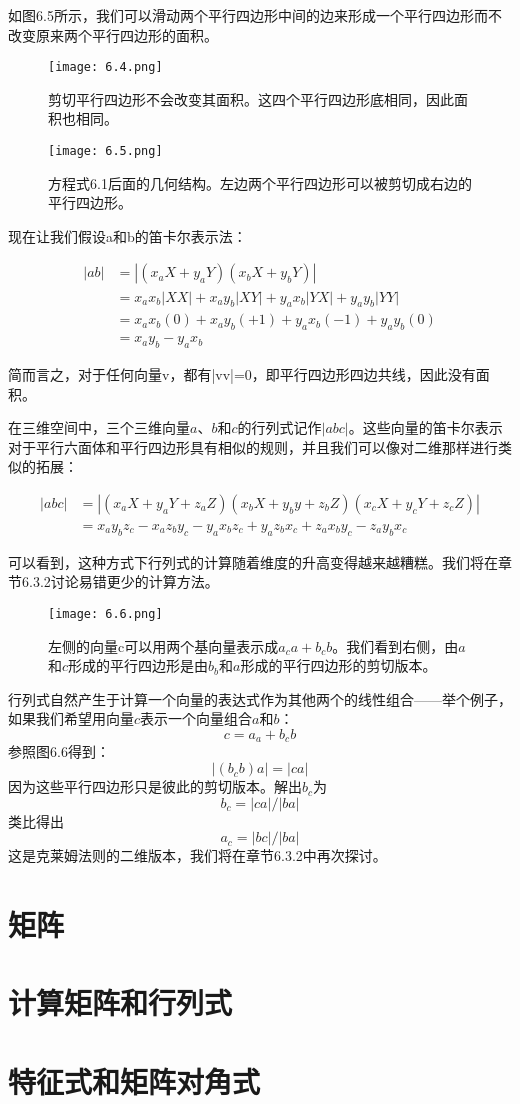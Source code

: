 \documentclass[lang=cn,12pt]{elegantbook}
\begin{document}
如图6.5所示，我们可以滑动两个平行四边形中间的边来形成一个平行四边形而不改变原来两个平行四边形的面积。

\begin{figure}[htbp]
\centering
\texttt{[image: 6.4.png]}
\caption{剪切平行四边形不会改变其面积。这四个平行四边形底相同，因此面积也相同。}
\end{figure}

\begin{figure}[htbp]
\centering
\texttt{[image: 6.5.png]}
\caption{方程式6.1后面的几何结构。左边两个平行四边形可以被剪切成右边的平行四边形。}
\end{figure}

现在让我们假设a和b的笛卡尔表示法：

\begin{align}
|ab| &= |(x_aX + y_aY)(x_bX + y_bY)| \nonumber\\
&=x_ax_b|XX|+x_ay_b|XY|+y_ax_b|YX|+y_ay_b|YY| \nonumber\\
&=x_ax_b(0)+x_ay_b(+1)+y_ax_b(-1)+y_ay_b(0) \nonumber\\
& = x_a y_b - y_a x_b \nonumber
\end{align}

简而言之，对于任何向量v，都有|vv|=0，即平行四边形四边共线，因此没有面积。

在三维空间中，三个三维向量$a$、$b$和$c$的行列式记作$|abc|$。这些向量的笛卡尔表示对于平行六面体和平行四边形具有相似的规则，并且我们可以像对二维那样进行类似的拓展：

\begin{align}
|abc| &= |(x_aX+y_aY+z_aZ)(x_bX+y_by+z_bZ)(x_cX+y_cY+z_cZ)| \nonumber\\
&=x_ay_bz_c-x_az_by_c-y_ax_bz_c+y_az_bx_c+z_ax_by_c-z_ay_bx_c \nonumber
\end{align}

可以看到，这种方式下行列式的计算随着维度的升高变得越来越糟糕。我们将在章节6.3.2讨论易错更少的计算方法。


\begin{figure}[htbp]
\centering
\texttt{[image: 6.6.png]}
\caption{左侧的向量c可以用两个基向量表示成$a_ca+b_cb$。我们看到右侧，由$a$和$c$形成的平行四边形是由$b_b$和$a$形成的平行四边形的剪切版本。}
\end{figure}

行列式自然产生于计算一个向量的表达式作为其他两个的线性组合——举个例子，如果我们希望用向量$c$表示一个向量组合$a$和$b$：$$c = a_a + b_cb$$参照图6.6得到：$$|(b_cb)a| = |ca|$$因为这些平行四边形只是彼此的剪切版本。解出$b_c$为$$b_c = |ca|/|ba|$$类比得出$$a_c = |bc|/|ba|$$这是克莱姆法则的二维版本，我们将在章节6.3.2中再次探讨。

\section{矩阵}
\section{计算矩阵和行列式}
\section{特征式和矩阵对角式}
\end{document}
